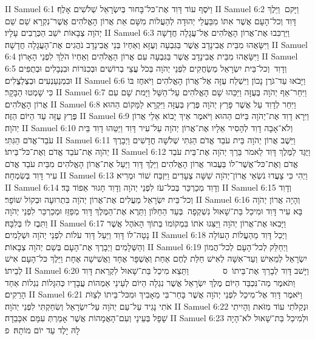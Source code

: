 II Samuel 6:1	וַיֹּסֶף עוֹד דָּוִד אֶת־כּל־בָּחוּר בְּיִשְׂרָאֵל שְׁלֹשִׁים אָלֶף׃
II Samuel 6:2	וַיָּקם  וַיֵּלֶךְ דָּוִד וְכל־הָעָם אֲשֶׁר אִתּוֹ מִבַּעֲלֵי יְהוּדָה לְהַעֲלוֹת מִשָּׁם אֵת אֲרוֹן הָאֱלֹהִים אֲשֶׁר־נִקְרָא שֵׁם שֵׁם יְהֹוָה צְבָאוֹת יֹשֵׁב הַכְּרֻבִים עָלָיו׃
II Samuel 6:3	וַיַּרְכִּבוּ אֶת־אֲרוֹן הָאֱלֹהִים אֶל־עֲגָלָה חֲדָשָׁה וַיִּשָּׂאֻהוּ מִבֵּית אֲבִינָדָב אֲשֶׁר בַּגִּבְעָה וְעֻזָּא וְאַחְיוֹ בְּנֵי אֲבִינָדָב נֹהֲגִים אֶת־הָעֲגָלָה חֲדָשָׁה׃
II Samuel 6:4	וַיִּשָּׂאֻהוּ מִבֵּית אֲבִינָדָב אֲשֶׁר בַּגִּבְעָה עִם אֲרוֹן הָאֱלֹהִים וְאַחְיוֹ הֹלֵךְ לִפְנֵי הָאָרוֹן׃
II Samuel 6:5	וְדָוִד  וְכל־בֵּית יִשְׂרָאֵל מְשַׂחֲקִים לִפְנֵי יְהֹוָה בְּכֹל עֲצֵי בְרוֹשִׁים וּבְכִנֹּרוֹת וּבִנְבָלִים וּבְתֻפִּים וּבִמְנַעַנְעִים וּבְצֶלְצֱלִים׃
II Samuel 6:6	וַיָּבֹאוּ עַד־גֹּרֶן נָכוֹן וַיִּשְׁלַח עֻזָּה אֶל־אֲרוֹן הָאֱלֹהִים וַיֹּאחֶז בּוֹ כִּי שָׁמְטוּ הַבָּקָר׃
II Samuel 6:7	וַיִּחַר־אַף יְהֹוָה בְּעֻזָּה וַיַּכֵּהוּ שָׁם הָאֱלֹהִים עַל־הַשַּׁל וַיָּמת שָׁם עִם אֲרוֹן הָאֱלֹהִים׃
II Samuel 6:8	וַיִּחַר לְדָוִד עַל אֲשֶׁר פָּרַץ יְהֹוָה פֶּרֶץ בְּעֻזָּה וַיִּקְרָא לַמָּקוֹם הַהוּא פֶּרֶץ עֻזָּה עַד הַיּוֹם הַזֶּה׃
II Samuel 6:9	וַיִּרָא דָוִד אֶת־יְהֹוָה בַּיּוֹם הַהוּא וַיֹּאמֶר אֵיךְ יָבוֹא אֵלַי אֲרוֹן יְהֹוָה׃
II Samuel 6:10	וְלֹא־אָבָה דָוִד לְהָסִיר אֵלָיו אֶת־אֲרוֹן יְהֹוָה עַל־עִיר דָּוִד וַיַּטֵּהוּ דָוִד בֵּית עֹבֵד־אֱדֹם הַגִּתִּי׃
II Samuel 6:11	וַיֵּשֶׁב אֲרוֹן יְהֹוָה בֵּית עֹבֵד אֱדֹם הַגִּתִּי שְׁלֹשָׁה חֳדָשִׁים וַיְבָרֶךְ יְהֹוָה אֶת־עֹבֵד אֱדֹם וְאֶת־כּל־בֵּיתוֹ׃
II Samuel 6:12	וַיֻּגַּד לַמֶּלֶךְ דָּוִד לֵאמֹר בֵּרַךְ יְהֹוָה אֶת־בֵּית עֹבֵד אֱדֹם וְאֶת־כּל־אֲשֶׁר־לוֹ בַּעֲבוּר אֲרוֹן הָאֱלֹהִים וַיֵּלֶךְ דָּוִד וַיַּעַל אֶת־אֲרוֹן הָאֱלֹהִים מִבֵּית עֹבֵד אֱדֹם עִיר דָּוִד בְּשִׂמְחָה׃
II Samuel 6:13	וַיְהִי כִּי צָעֲדוּ נֹשְׂאֵי אֲרוֹן־יְהֹוָה שִׁשָּׁה צְעָדִים וַיִּזְבַּח שׁוֹר וּמְרִיא׃
II Samuel 6:14	וְדָוִד מְכַרְכֵּר בְּכל־עֹז לִפְנֵי יְהֹוָה וְדָוִד חָגוּר אֵפוֹד בָּד׃
II Samuel 6:15	וְדָוִד וְכל־בֵּית יִשְׂרָאֵל מַעֲלִים אֶת־אֲרוֹן יְהֹוָה בִּתְרוּעָה וּבְקוֹל שׁוֹפָר׃
II Samuel 6:16	וְהָיָה אֲרוֹן יְהֹוָה בָּא עִיר דָּוִד וּמִיכַל בַּת־שָׁאוּל נִשְׁקְפָה  בְּעַד הַחַלּוֹן וַתֵּרֶא אֶת־הַמֶּלֶךְ דָּוִד מְפַזֵּז וּמְכַרְכֵּר לִפְנֵי יְהֹוָה וַתִּבֶז לוֹ בְּלִבָּהּ׃
II Samuel 6:17	וַיָּבִאוּ אֶת־אֲרוֹן יְהֹוָה וַיַּצִּגוּ אֹתוֹ בִּמְקוֹמוֹ בְּתוֹךְ הָאֹהֶל אֲשֶׁר נָטָה־לוֹ דָּוִד וַיַּעַל דָּוִד עֹלוֹת לִפְנֵי יְהֹוָה וּשְׁלָמִים׃
II Samuel 6:18	וַיְכַל דָּוִד מֵהַעֲלוֹת הָעוֹלָה וְהַשְּׁלָמִים וַיְבָרֶךְ אֶת־הָעָם בְּשֵׁם יְהֹוָה צְבָאוֹת׃
II Samuel 6:19	וַיְחַלֵּק לְכל־הָעָם לְכל־הֲמוֹן יִשְׂרָאֵל לְמֵאִישׁ וְעַד־אִשָּׁה לְאִישׁ חַלַּת לֶחֶם אַחַת וְאֶשְׁפָּר אֶחָד וַאֲשִׁישָׁה אֶחָת וַיֵּלֶךְ כּל־הָעָם אִישׁ לְבֵיתוֹ׃
II Samuel 6:20	וַיָּשׁב דָּוִד לְבָרֵךְ אֶת־בֵּיתוֹ {ס}        וַתֵּצֵא מִיכַל בַּת־שָׁאוּל לִקְרַאת דָּוִד וַתֹּאמֶר מַה־נִּכְבַּד הַיּוֹם מֶלֶךְ יִשְׂרָאֵל אֲשֶׁר נִגְלָה הַיּוֹם לְעֵינֵי אַמְהוֹת עֲבָדָיו כְּהִגָּלוֹת נִגְלוֹת אַחַד הָרֵקִים׃
II Samuel 6:21	וַיֹּאמֶר דָּוִד אֶל־מִיכַל לִפְנֵי יְהֹוָה אֲשֶׁר בָּחַר־בִּי מֵאָבִיךְ וּמִכּל־בֵּיתוֹ לְצַוֺּת אֹתִי נָגִיד עַל־עַם יְהֹוָה עַל־יִשְׂרָאֵל וְשִׂחַקְתִּי לִפְנֵי יְהֹוָה׃
II Samuel 6:22	וּנְקַלֹּתִי עוֹד מִזֹּאת וְהָיִיתִי שָׁפָל בְּעֵינָי וְעִם־הָאֲמָהוֹת אֲשֶׁר אָמַרְתְּ עִמָּם אִכָּבֵדָה׃
II Samuel 6:23	וּלְמִיכַל בַּת־שָׁאוּל לֹא־הָיָה לָהּ יָלֶד עַד יוֹם מוֹתָהּ׃ {פ}
